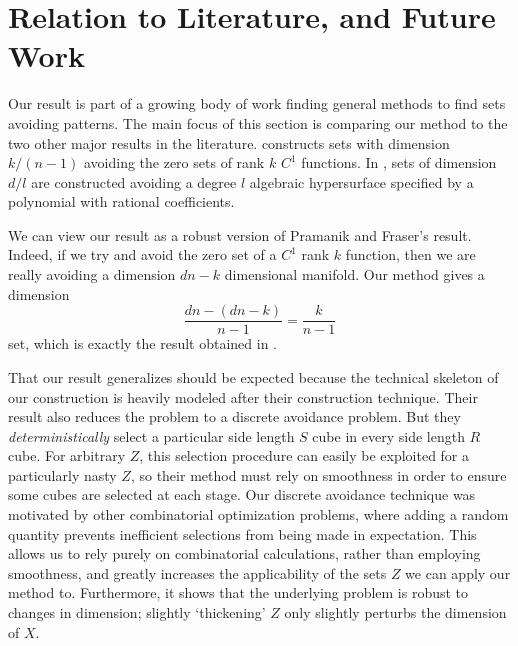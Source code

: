 \documentclass[dvipsnames]{article}
\theoremstyle{plain}
\theoremstyle{plain}
\begin{document}
\section{Relation to Literature, and Future Work}

Our result is part of a growing body of work finding general methods to find sets avoiding patterns. The main focus of this section is comparing our method to the two other major results in the literature. \cite{MalabikaRob} constructs sets with dimension $k/(n-1)$ avoiding the zero sets of rank $k$ $C^1$ functions. In \cite{Mathe}, sets of dimension $d/l$ are constructed avoiding a degree $l$ algebraic hypersurface specified by a polynomial with rational coefficients.

We can view our result as a robust version of Pramanik and Fraser's result. Indeed, if we try and avoid the zero set of a $C^1$ rank $k$ function, then we are really avoiding a dimension $dn - k$ dimensional manifold. Our method gives a dimension
%
\[ \frac{dn - (dn - k)}{n - 1} = \frac{k}{n - 1} \]
%
set, which is exactly the result obtained in \cite{MalabikaRob}.

That our result generalizes \cite{MalabikaRob} should be expected because the technical skeleton of our construction is heavily modeled after their construction technique. Their result also reduces the problem to a discrete avoidance problem. But they {\it deterministically} select a particular side length $S$ cube in every side length $R$ cube. For arbitrary $Z$, this selection procedure can easily be exploited for a particularly nasty $Z$, so their method must rely on smoothness in order to ensure some cubes are selected at each stage. Our discrete avoidance technique was motivated by other combinatorial optimization problems, where adding a random quantity prevents inefficient selections from being made in expectation. This allows us to rely purely on combinatorial calculations, rather than employing smoothness, and greatly increases the applicability of the sets $Z$ we can apply our method to. Furthermore, it shows that the underlying problem is robust to changes in dimension; slightly `thickening' $Z$ only slightly perturbs the dimension of $X$.
\end{document}
